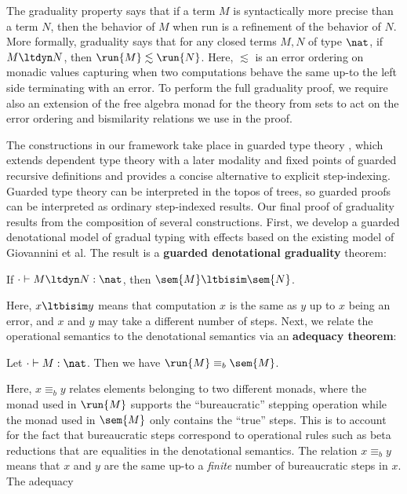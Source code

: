 \documentclass[acmsmall,screen,review,anonymous]{acmart}
\theoremstyle{remark}
\begin{document}
The graduality property says that if a term $M$ is syntactically more
precise than a term $N$, then the behavior of $M$ when run is a
refinement of the behavior of $N$. More formally, graduality says that
for any closed terms $M, N$ of type $\nat$, if $M \ltdyn N$, then
$\run{M} \lesssim \run{N}$. Here, $\lesssim$ is an error ordering on
monadic values capturing when two computations behave the same up-to
the left side terminating with an error. To perform the full
graduality proof, we require also an extension of the free algebra
monad for the theory from sets to act on the error ordering and
bismilarity relations we use in the proof.

The constructions in our framework take place in guarded type theory
\cite{birkedal-mogelberg-schwinghammer-stovring2011,
kristensen-mogelberg-vezzosi2022}, which extends dependent type theory with a
later modality and fixed points of guarded recursive definitions and provides a
concise alternative to explicit step-indexing. Guarded type theory can be
interpreted in the topos of trees, so guarded proofs can be interpreted as
ordinary step-indexed results.
%
Our final proof of graduality results from the composition of several
constructions. First, we develop a guarded denotational model of gradual typing
with effects based on the existing model of Giovannini et al. The result is a
\textbf{guarded denotational graduality} theorem:
%
\begin{theorem}
  If $\cdot \vdash M \ltdyn N: \nat$, then $\sem{M} \ltbisim \sem{N}$.
\end{theorem}
%
Here, $x \ltbisim y$ means that computation $x$ is the same as $y$ up to $x$
being an error, and $x$ and $y$ may take a different number of steps.
%
Next, we relate the operational semantics to the denotational semantics
via an \textbf{adequacy theorem}:
%
\begin{theorem}[Adequacy]
  Let $\cdot \vdash M : \nat$. Then we have $\run{M} \equiv_b \sem{M}$.
\end{theorem}
%
Here, $x \equiv_b y$ relates elements belonging to two different
monads, where the monad used in $\run{M}$ supports the
``bureaucratic'' stepping operation while the monad used in $\sem{M}$
only contains the ``true'' steps. This is to account for the fact that
bureaucratic steps correspond to operational rules such as beta
reductions that are equalities in the denotational semantics.
The relation $x \equiv_b y$ means that $x$ and $y$ are the same up-to
a \emph{finite} number of bureaucratic steps in $x$. The adequacy
\end{document}
